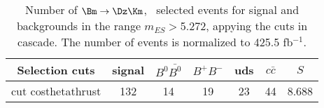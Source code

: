 \begin{table}[htb!]
 \begin{center}
 {\small
 \begin{tabular}{|c|c|c|c|c|c|c|} \hline
 Selection cuts  & signal  & $B^0\bar{B^0}$ & $B^+B^-$ & uds & $c\bar{c}$ & $S$  \\ \hline\hline 
cut costhetathrust  &  132  &  14  &  19  &  23  &  44  &  8.688 \\ 
\hline
 \end{tabular}
 }
 \caption{\small Number of $\Bm  \to \Dz \Km$, \kspipi\ selected events for signal and backgrounds in the range $m_{ES}$$>$5.272, appying the cuts in cascade. The number of events is normalized to 425.5 fb$^{-1}$.}
 \label{tab:selectiondk_kspipi}
 \end{center}
 \end{table}

